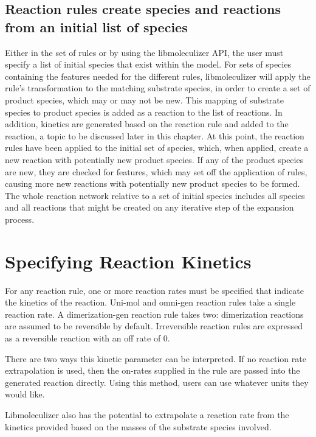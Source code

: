 \subsection{Reaction rules create species and reactions from an
  initial list of species}

Either in the set of rules or by using the libmoleculizer API, the
user must specify a list of initial species that exist within the
model. For sets of species containing the features needed for the
different rules, libmoleculizer will apply the rule's transformation
to the matching substrate species, in order to create a set of product
species, which may or may not be new.  This mapping of substrate
species to product species is added as a reaction to the list of
reactions.  In addition, kinetics are generated based on the reaction
rule and added to the reaction, a topic to be discussed later in this
chapter. At this point, the reaction rules have been applied to the
initial set of species, which, when applied, create a new reaction
with potentially new product species.  If any of the product species
are new, they are checked for features, which may set off the
application of rules, causing more new reactions with potentially new
product species to be formed.  The whole reaction network relative to
a set of initial species includes all species and all reactions that
might be created on any iterative step of the expansion process.  

\section{Specifying Reaction Kinetics} 

For any reaction rule, one or more reaction rates must be specified
that indicate the kinetics of the reaction.  Uni-mol and omni-gen
reaction rules take a single reaction rate.  A dimerization-gen
reaction rule takes two: dimerization reactions are assumed to be
reversible by default.  Irreversible reaction rules are expressed as a
reversible reaction with an off rate of 0.  

There are two ways this kinetic parameter can be interpreted.  If no
reaction rate extrapolation is used, then the on-rates supplied in the
rule are passed into the generated reaction directly.  Using this
method, users can use whatever units they would like.

Libmoleculizer also has the potential to extrapolate a reaction rate
from the kinetics provided based on the masses of the substrate
species involved. 

